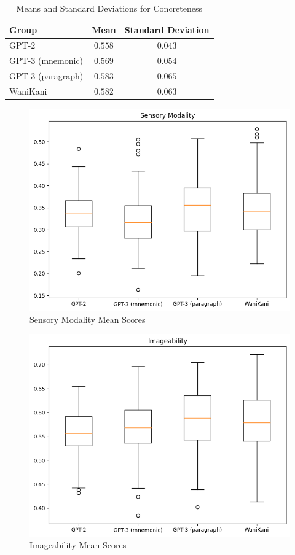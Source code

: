 \begin{table}[ht] 
\centering
\caption{Means and Standard Deviations for Concreteness}
\label{table:group_stats}
\begin{tabular}{lcc}
\toprule
Group & Mean & Standard Deviation \\
\midrule
GPT-2& $0.558$ & $0.043$ \\
GPT-3 (mnemonic) & $0.569$ & $0.054$ \\
GPT-3 (paragraph)& $0.583$ & $0.065$ \\
WaniKani & $0.582$ & $0.063$ \\
\bottomrule
\end{tabular}
\label{tab:mean_std_concr}
\end{table}

\begin{figure}
    \centering
    \includegraphics[width=400pt]{resources/ser_mean_box_plot.png}
    \caption{Sensory Modality Mean Scores}
    \label{figure:ser_mean_box_plot}
\end{figure}

\begin{figure}
    \centering
    \includegraphics[width=400pt]{resources/img_mean_box_plot.png}
    \caption{Imageability Mean Scores}
    \label{figure:img_mean_box_plot}
\end{figure}

